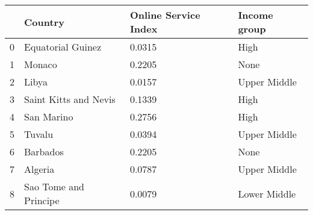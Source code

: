 \begin{tabular}{llll}
\toprule
{} &                Country & Online Service Index &  Income group \\
\midrule
0 &      Equatorial Guinez &               0.0315 &          High \\
1 &                 Monaco &               0.2205 &          None \\
2 &                  Libya &               0.0157 &  Upper Middle \\
3 &  Saint Kitts and Nevis &               0.1339 &          High \\
4 &             San Marino &               0.2756 &          High \\
5 &                 Tuvalu &               0.0394 &  Upper Middle \\
6 &               Barbados &               0.2205 &          None \\
7 &                Algeria &               0.0787 &  Upper Middle \\
8 &  Sao Tome and Principe &               0.0079 &  Lower Middle \\
\bottomrule
\end{tabular}
